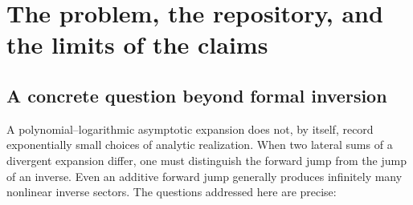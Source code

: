 \documentclass[11pt,a4paper]{article}
\numberwithin{equation}{section}
\theoremstyle{definition}
\theoremstyle{remark}
\newcommand{\e}{\mathrm e}
\newcommand{\ii}{\mathrm i}
\newcommand{\dd}{\,\mathrm d}
\newcommand{\bn}{\boldsymbol n}
\newcommand{\bs}{\boldsymbol\sigma}
\begin{document}
\begin{abstract}
Let $F$ be an analytic map with a chosen local inverse $G$, and perturb it by a finite sum $\sum_j\sigma_j\phi_j$. We prove a quantitative inverse-transport theorem: the perturbed inverse has coefficients
\[
 [\bs^{\bn}]G_{\bs}(x)=\frac{(-1)^N}{\bn!}
 \partial_x^{N-1}\!\left(G'(x)\prod_j\phi_j(G(x))^{n_j}\right),
 \qquad N=|\bn|\geq1,
\]
and, under an explicit boundary-separation hypothesis, the absolute tail above total degree $M$ is at most $\rho\chi^{M+1}/((M+1)(1-\chi))$. Specializing to exponential actions yields resonance-stable mixed sectors and commuting scalar transport flows. We then study
\[
 F_\pm(z)=z+a\log z+\sum_j b_j
 \int_{\Gamma_\pm}\frac{\e^{-zt}}{A_j-t}\dd t,
 \qquad A_j>0.
\]
Its forward jump is exactly $2\pi\ii\sum_jb_j\e^{-A_jz}$. In the coordinate $y+a\log y=x$, the inverse correction is an ordinary Gevrey--1 resurgent series; this is proved by verifying the hypotheses of established resurgent and summable implicit-function theorems with an explicit Borel kernel. The finite inverse jump is thereby completely determined, including all mixed sectors and their analytic realization. A sign-definite, order-$\e^{-2x}x^{2a}$ defect separates the arithmetic average of lateral inverses from the inverse of the arithmetic average. Finally, the normalized amplitude has convergence radius $\e^{-1}+O(g^{-2})$, a computable curvature-shifted fold, and the double-scaling limit $g(s+1)\to\sqrt{2\zeta+a/A}$. Exact symbolic checks, 100-digit numerical experiments, implementation formulas, and a research agenda accompany the proofs.
\end{abstract}
\tableofcontents
\newpage

\section{The problem, the repository, and the limits of the claims}
\label{sec:context}

\subsection{A concrete question beyond formal inversion}
A polynomial--logarithmic asymptotic expansion does not, by itself, record exponentially small choices of analytic realization. When two lateral sums of a divergent expansion differ, one must distinguish the forward jump from the jump of an inverse. Even an additive forward jump generally produces infinitely many nonlinear inverse sectors. The questions addressed here are precise:
\end{document}
